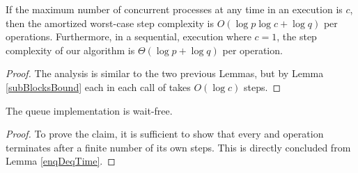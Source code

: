 \begin{observation}
    If the maximum number of concurrent processes at any time in an execution is $c$, then the amortized worst-case step complexity is $O(\log p\log c + \log q)$ per operations. Furthermore, in a sequential, execution where $c=1$, the step complexity of our algorithm is $\Theta(\log p + \log q)$ per operation.
\end{observation}
\begin{proof}
    The analysis is similar to the two previous Lemmas, but by Lemma \ref{subBlocksBound} each  in each call of  takes $O(\log c)$ steps.
\end{proof}

\begin{theorem}
The queue implementation is wait-free.
\end{theorem}
\begin{proof}
To prove the claim, it is sufficient to show that every  and  operation terminates after a finite number of its own steps. This is directly concluded from Lemma \ref{enqDeqTime}.
\end{proof}
